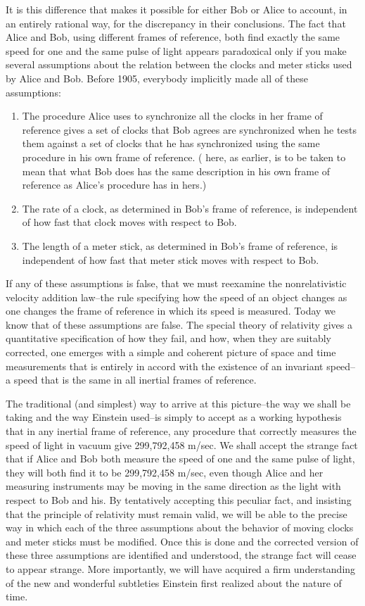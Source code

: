It is this difference that makes it possible for either Bob or Alice to account, in an entirely rational way, for the discrepancy in their conclusions. The fact that Alice and Bob, using different frames of reference, both find exactly the same speed for one and the same pulse of light appears paradoxical only if you make several assumptions about the relation between the clocks and meter sticks used by Alice and Bob. Before 1905, everybody implicitly made all of these assumptions:
\begin{enumerate}[1.]
\item The procedure Alice uses to synchronize all the clocks in her frame of reference gives a set of clocks that Bob agrees are synchronized when he tests them against a set of clocks that he has synchronized using the same procedure in his own frame of reference. ( here, as earlier, is to be taken to mean that what Bob does has the same description in his own frame of reference as Alice's procedure has in hers.)
\item The rate of a clock, as determined in Bob's frame of reference, is independent of how fast that clock moves with respect to Bob.
\item The length of a meter stick, as determined in Bob's frame of reference, is independent of how fast that meter stick moves with respect to Bob.
\end{enumerate}

If any of these assumptions is false, that we must reexamine the nonrelativistic velocity addition law--the rule specifying how the speed of an object changes as one changes the frame of reference in which its speed is measured. Today we know that  of these assumptions are false. The special theory of relativity gives a quantitative specification of how they fail, and how, when they are suitably corrected, one emerges with a simple and coherent picture of space and time measurements that is entirely in accord with the existence of an invariant speed--a speed that is the same in all inertial frames of reference.

The traditional (and simplest) way to arrive at this picture--the way we shall be taking and the way Einstein used--is simply to accept as a working hypothesis that in any inertial frame of reference, any procedure that correctly measures the speed of light in vacuum  give 299,792,458 m/sec. We shall accept the strange fact that if Alice and Bob both measure the speed of one and the same pulse of light, they will both find it to be 299,792,458 m/sec, even though Alice and her measuring instruments may be moving in the same direction as the light with respect to Bob and his. By tentatively accepting this peculiar fact, and insisting that the principle of relativity must remain valid, we will be able to  the precise way in which each of the three assumptions about the behavior of moving clocks and meter sticks must be modified. Once this is done and the corrected version of these three assumptions are identified and understood, the strange fact will cease to appear strange. More importantly, we will have acquired a firm understanding of the new and wonderful subtleties Einstein first realized about the nature of time. 

